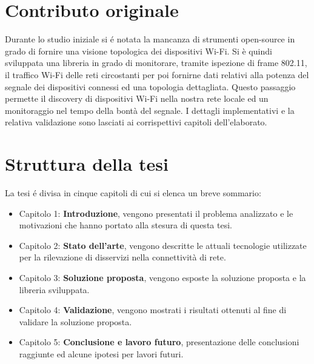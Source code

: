 \section{Contributo originale}

Durante lo studio iniziale si \'e notata la mancanza di strumenti open-source in grado di fornire una visione topologica dei dispositivi Wi-Fi.
Si \`e quindi sviluppata una libreria in grado di monitorare, tramite ispezione di frame 802.11, il traffico Wi-Fi delle reti circostanti per poi fornirne dati relativi alla potenza del segnale dei dispositivi connessi ed una topologia dettagliata.
Questo passaggio permette il discovery di dispositivi Wi-Fi nella nostra rete locale ed un monitoraggio nel tempo della bont\`a del segnale.
I dettagli implementativi e la relativa validazione sono lasciati ai corrispettivi capitoli dell'elaborato.

\newpage

\section{Struttura della tesi}

La tesi \'e divisa in cinque capitoli di cui si elenca un breve sommario:

\begin{itemize}
	\item Capitolo 1: \textbf{Introduzione}, vengono presentati il problema analizzato e le motivazioni che hanno portato alla stesura di questa tesi.
	\item Capitolo 2: \textbf{Stato dell'arte}, vengono descritte le attuali tecnologie utilizzate per la rilevazione di disservizi nella connettivit\`a di rete.
	\item Capitolo 3: \textbf{Soluzione proposta}, vengono esposte la soluzione proposta e la libreria sviluppata. 
	\item Capitolo 4: \textbf{Validazione}, vengono mostrati i risultati ottenuti al fine di validare la soluzione proposta.
	\item Capitolo 5: \textbf{Conclusione e lavoro futuro}, presentazione delle conclusioni raggiunte ed alcune ipotesi per lavori futuri.
\end{itemize}